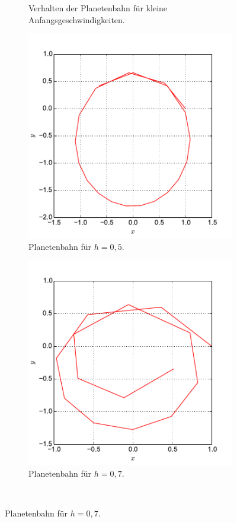 \begin{figure}[H]
\begin{subfigure}[c]{0.5\textwidth}
		\caption{Verhalten der Planetenbahn für kleine Anfangsgeschwindigkeiten. \label{fig:Bahn3}}
	\end{subfigure}
	\begin{subfigure}[c]{0.5\textwidth}
		\includegraphics[width = \textwidth]{../Plots/Plot_4_A_3.pdf}
		\caption{Planetenbahn für $h=0,5$.}
	\end{subfigure}
	\begin{subfigure}[c]{0.5\textwidth}	
		\includegraphics[width = \textwidth]{../Plots/Plot_4_A_4.pdf}
		\caption{Planetenbahn für $h=0,7$.\label{fig:Bahn2}}
	\end{subfigure}\\
\end{figure}
